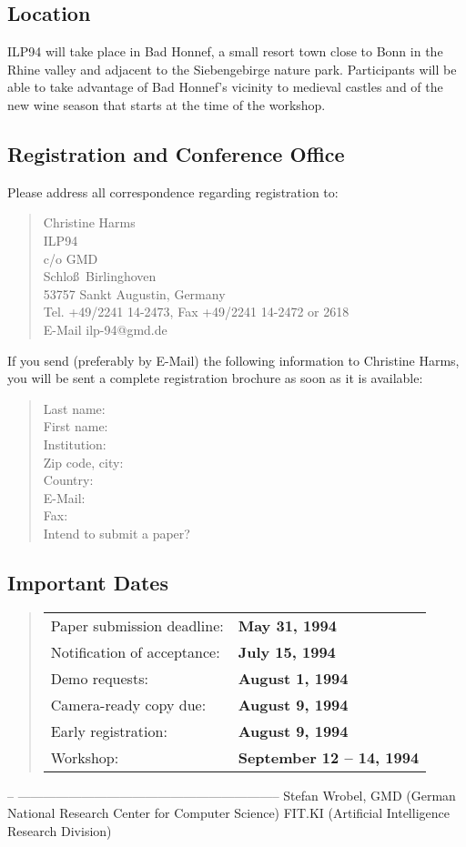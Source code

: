 \subsection*{Location}
ILP94 will take place in Bad Honnef, a small resort town close to Bonn
in the Rhine valley and adjacent to the Siebengebirge nature park.
Participants will be able to take advantage of Bad Honnef's vicinity
to medieval castles and of the new wine season that starts at the time
of the workshop.
\subsection*{Registration and Conference Office}
Please address all correspondence regarding registration to:
\begin{quote}
Christine Harms\\
ILP94\\
c/o GMD\\
Schlo\ss\ Birlinghoven\\
53757 Sankt Augustin, Germany\\
Tel. +49/2241 14-2473, Fax +49/2241 14-2472 or 2618\\
E-Mail ilp-94@gmd.de
\end{quote}
If you send (preferably by E-Mail) the following information to
Christine Harms, you will be sent a complete registration brochure as
soon as it is available:
\begin{quote}
Last name:\\
First name:\\
Institution:\\
Zip code, city:\\
Country:\\
E-Mail:\\
Fax:\\
Intend to submit a paper?\\
\end{quote}
\subsection*{Important Dates}
\begin{quote}
\begin{tabular}{ll}
Paper submission deadline:&{\bf May 31, 1994}\\
Notification of acceptance:&{\bf July 15, 1994}\\
Demo requests:&{\bf August 1, 1994}\\
Camera-ready copy due:&{\bf August 9, 1994}\\
Early registration:&{\bf August 9, 1994}\\
Workshop:&{\bf September 12 -- 14, 1994}
\end{tabular}
\end{quote}


--
--------------------------------------------------------------
Stefan Wrobel,
GMD (German National Research Center for Computer Science)
FIT.KI (Artificial Intelligence Research Division)


